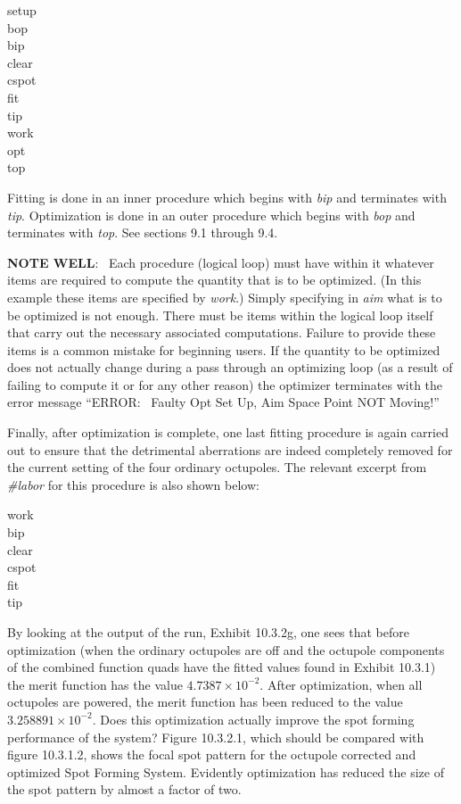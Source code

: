 \begin{center}
setup \\
bop \\
bip \\
clear \\
cspot \\
fit \\
tip \\
work \\
opt \\
top \\
\end{center}

\noindent Fitting is done in an inner procedure which begins with {\em
bip} and terminates with {\em tip}.  Optimization is done in an outer
procedure which begins with {\em bop} and terminates with {\em top}.  See
sections 9.1 through 9.4.

{\bf NOTE WELL}: \ Each procedure (logical loop) must have within it
whatever items are required to compute the quantity that is to be
optimized.  (In this example these items are specified by {\em work}.)  Simply specifying in {\em aim} what is to be optimized is not enough.
There must be items within the logical loop itself that carry out the
necessary associated computations.  Failure to provide these items is a
common mistake for beginning \Mary users.  If the quantity to be optimized
does not actually change during a pass through an optimizing loop (as a result of
failing to compute it or for any other reason) the optimizer terminates with the
error message ``ERROR: \ Faulty Opt Set Up, Aim Space Point NOT Moving!''

Finally, after optimization is complete, one
last fitting procedure is again carried out to ensure that the
detrimental aberrations are indeed completely removed for the current
setting of the four ordinary octupoles.  The relevant
excerpt from {\em \#labor} for this procedure is also shown below:

\begin{center}
work \\
bip \\
clear \\
cspot \\
fit \\
tip \\
\end{center}

By looking at the output of the \Mary run, Exhibit 10.3.2g, one sees that
before optimization (when the ordinary octupoles are off and the octupole
components of the combined function quads have the fitted values found in
Exhibit 10.3.1) the merit function has the value $4.7387 \times
10^{-2}$.  After optimization, when all octupoles are powered, the merit
function has been reduced to the value $3.258891 \times 10^{-2}$.  Does
this optimization actually improve the spot forming performance of the
system?  Figure 10.3.2.1, which should be compared with figure 10.3.1.2, shows
the focal spot pattern for the octupole corrected and optimized Spot
Forming System.  Evidently optimization has reduced the size of the spot
pattern by almost a factor of two.

